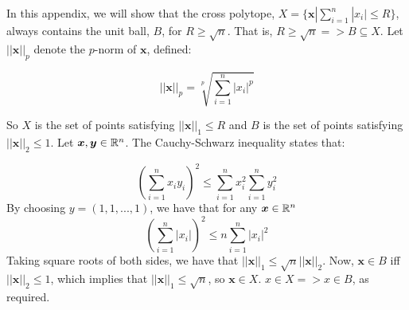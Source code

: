 In this appendix, we will show that the cross polytope, $X = \{\bm{x} | \sum^n_{i=1}|x_i| \leqslant R\}$, always contains the unit ball, $B$, for $R \geqslant \sqrt{n}$. That is, $R \geqslant \sqrt{n} => B \subseteq X$. Let $||\bm{x}||_p$ denote the $p$-norm of ${\bm x}$, defined:

$$
||\bm{x}||_p = \sqrt[p]{\sum^n_{i=1} |x_i|^p}
$$

So $X$ is the set of points satisfying $||\bm{x}||_1 \leqslant R$ and $B$ is the set of points satisfying $||\bm{x}||_2 \leqslant 1$. Let ${\bm x}, {\bm y} \in \mathbb{R}^n$. The Cauchy-Schwarz inequality states that:

$$
\left(\sum^n_{i=1} x_i y_i\right)^2 \leqslant \sum^n_{i=1} x_i^2 \sum^n_{i=1} y_i^2 
$$
By choosing $y = (1,1,...,1)$, we have that for any ${\bm x} \in \mathbb{R}^n$
$$
\left(\sum^n_{i=1} |x_i| \right)^2 \leqslant n \sum^n_{i=1} |x_i|^2
$$
Taking square roots of both sides, we have that $||\bm{x}||_1 \leqslant \sqrt{n} ||\bm{x} ||_2$. Now, ${\bm x} \in B$ iff $||{\bm x}||_2 \leqslant 1$, which implies that $||{\bm x}||_1 \leqslant \sqrt{n}$, so ${\bm x} \in X$. $x \in X => x \in B$, as required.